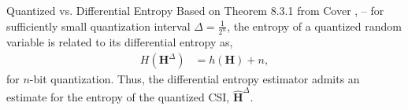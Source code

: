 \documentclass{beamer}
\begin{document}
  \begin{frame}{Quantized vs. Differential Entropy}
  \footnotesize{
    Based on Theorem 8.3.1 from Cover \cite{ref:Cover1999Elements}, -- for sufficiently small quantization interval $\Delta = \frac {1}{2^n}$, the entropy of a quantized random variable is related to its differential entropy as,
    \begin{align*}
      H(\mathbf H^{\Delta}) &= h(\mathbf H) + n,
    \end{align*}
    for $n$-bit quantization. Thus, the differential entropy estimator admits an estimate for the entropy of the quantized CSI, $\hat{\mathbf H}^\Delta$.
  }
  \end{frame}

\end{document}
